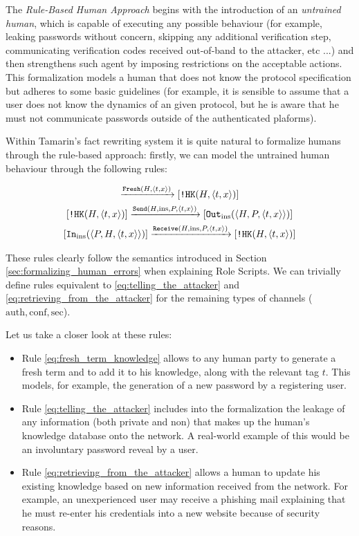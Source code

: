 \documentclass{article}
\newcommand{\mono}[1]{\textrm{\tt #1}}
\begin{document}
The \textit{Rule-Based Human Approach} begins with the introduction of an \textit{untrained human}, which is capable of executing any possible behaviour (for example, leaking passwords without concern, skipping any additional verification step, communicating verification codes received out-of-band to the attacker, etc ...) and then strengthens such agent by imposing restrictions on the acceptable actions. This formalization models a human that does not know the protocol specification but adheres to some basic guidelines (for example, it is sensible to assume that a user does not know the dynamics of an given protocol, but he is aware that he must not communicate passwords outside of the authenticated plaforms).

Within Tamarin's fact rewriting system it is quite natural to formalize humans through the rule-based approach: firstly, we can model the untrained human behaviour through the following rules:

\begin{gather}
    [\mono{Fr}(x)] \xrightarrow{\mono{Fresh}(H, \langle t,x \rangle)} [\mono{!HK}(H, \langle t,x \rangle)] \label{eq:fresh_term_knowledge}\\
    [\mono{!HK}(H, \langle t, x \rangle)] \xrightarrow{\mono{Send}(H, \textrm{ins}, P, \langle t,x \rangle)} [\mono{Out}_{\textrm{ins}}(\langle H, P, \langle t,x \rangle \rangle)] \label{eq:telling_the_attacker}\\
    [\mono{In}_{\textrm{ins}}(\langle P, H, \langle t,x \rangle \rangle)] \xrightarrow{\mono{Receive}(H, \textrm{ins}, P, \langle t,x \rangle)} [\mono{!HK}(H, \langle t,x \rangle)] \label{eq:retrieving_from_the_attacker}
\end{gather}

These rules clearly follow the semantics introduced in Section \ref{sec:formalizing_human_errors} when explaining Role Scripts. We can trivially define rules equivalent to \ref{eq:telling_the_attacker} and \ref{eq:retrieving_from_the_attacker} for the remaining types of channels ($\textrm{auth}, \textrm{conf}, \textrm{sec}$).

Let us take a closer look at these rules:

\begin{itemize}
    \item Rule \ref{eq:fresh_term_knowledge} allows to any human party to generate a fresh term and to add it to his knowledge, along with the relevant tag $t$. This models, for example, the generation of a new password by a registering user.
    \item Rule \ref{eq:telling_the_attacker} includes into the formalization the leakage of any information (both private and non) that makes up the human's knowledge database onto the network. A real-world example of this would be an involuntary password reveal by a user.
    \item Rule \ref{eq:retrieving_from_the_attacker} allows a human to update his existing knowledge based on new information received from the network. For example, an unexperienced user may receive a phishing mail explaining that he must re-enter his credentials into a new website because of security reasons.
\end{itemize}
\end{document}
